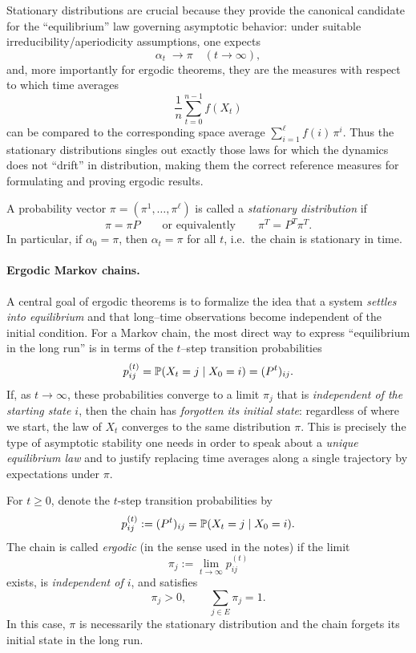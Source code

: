 Stationary distributions are crucial because they provide the canonical candidate for the ``equilibrium'' law
governing asymptotic behavior: under suitable irreducibility/aperiodicity assumptions, one expects
\[
\alpha_t \;\to \pi \quad (t\to\infty),
\]
and, more importantly for ergodic theorems, they are the measures with respect to which time averages
\[
\frac1n\sum_{t=0}^{n-1} f(X_t)
\]
can be compared to the corresponding space average $\sum_{i=1}^\ell f(i)\,\pi^i$.
Thus the stationary distributions singles out exactly those laws for which the dynamics does not ``drift'' in distribution,
making them the correct reference measures for formulating and proving ergodic results.


\begin{definition}

A probability vector \(\pi = (\pi^1,\dots,\pi^\ell)\) is called a \emph{stationary distribution} if
\[
\pi = \pi P
\qquad\textrm{or equivalently}\qquad
\pi^T = P^T \pi^T.
\]
In particular, if \(\alpha_0=\pi\), then \(\alpha_t=\pi\) for all \(t\), i.e.\ the chain is stationary in time.

\end{definition}

\paragraph{Ergodic Markov chains.}
A central goal of ergodic theorems is to formalize the idea that a system \emph{settles into equilibrium} and
that long--time observations become independent of the initial condition. For a Markov chain, the most direct
way to express ``equilibrium in the long run'' is in terms of the $t$--step transition probabilities
\[
p_{ij}^{(t)}=\mathbb{P}(X_t=j\mid X_0=i)=(P^t)_{ij}.
\]
If, as $t\to\infty$, these probabilities converge to a limit $\pi_j$ that is \emph{independent of the starting state $i$},
then the chain has \emph{forgotten its initial state}: regardless of where we start, the law of $X_t$ converges to the
same distribution $\pi$. This is precisely the type of asymptotic stability one needs in order to speak about a
\emph{unique equilibrium law} and to justify replacing time averages along a single trajectory by expectations under $\pi$.

\begin{definition}

For \(t\ge 0\), denote the \(t\)-step transition probabilities by
\[
p_{ij}^{(t)} := (P^t)_{ij} = \mathbb{P}(X_t=j \mid X_0=i).
\]
The chain is called \emph{ergodic} (in the sense used in the notes) if the limit
\[
\pi_j := \lim_{t\to\infty} p_{ij}^{(t)}
\]
exists, is \emph{independent of \(i\)}, and satisfies
\[
\pi_j>0,
\qquad
\sum_{j\in E}\pi_j = 1.
\]
In this case, \(\pi\) is necessarily the stationary distribution and the chain forgets its initial state in the long run.
    
\end{definition}

